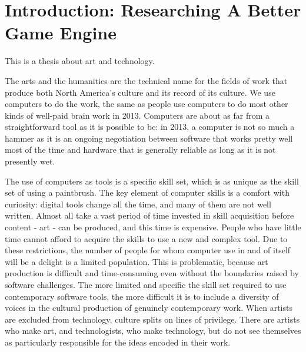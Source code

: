 
\chapter{Introduction: Researching A Better Game Engine} %

\label{Chapter1} %



This is a thesis about art and technology. 

The arts and the humanities are the technical name for the fields of work that produce both North America’s culture and its record of its culture. We use computers to do the work, the same as people use computers to do most other kinds of well-paid brain work in 2013. Computers are about as far from a straightforward tool as it is possible to be: in 2013, a computer is not so much a hammer as it is an ongoing negotiation between software that works pretty well most of the time and hardware that is generally reliable as long as it is not presently wet.

The use of computers as tools is a specific skill set, which is as unique as the skill set of using a paintbrush. The key element of computer skills is a comfort with curiosity: digital tools change all the time, and many of them are not well written. Almost all take a vast period of time invested in skill acquisition before content - art - can be produced, and this time is expensive. People who have little time cannot afford to acquire the skills to use a new and complex tool. Due to these restrictions, the number of people for whom computer use in and of itself will be a delight is a limited population. This is problematic, because art production is difficult and time-consuming even without the boundaries raised by software challenges. The more limited and specific the skill set required to use contemporary software tools, the more difficult it is to include a diversity of voices in the cultural production of genuinely contemporary work. When artists are excluded from technology, culture splits on lines of privilege. There are artists who make art, and technologists, who make technology, but do not see themselves as particularly responsible for the ideas encoded in their work. 

